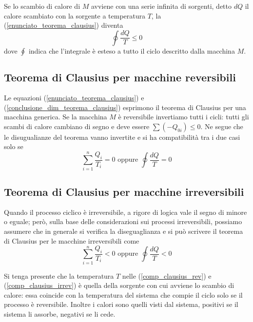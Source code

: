 \documentclass[class=book, crop=false, oneside, 12pt]{standalone}
\begin{document}
Se lo scambio di calore di \(M\) avviene con una serie infinita di sorgenti, detto \(d Q\) il calore scambiato con la sorgente a temperatura \(T\), la (\ref{enunciato_teorema_clausius}) diventa
\begin{equation} \label{conclusione_dim_teorema_clausius}
    \oint \frac{d Q}{T} \leq 0
\end{equation}
dove \(\oint\) indica che l'integrale è esteso a tutto il ciclo descritto dalla macchina \(M\).

\subsection{Teorema di Clausius per macchine reversibili}

Le equazioni (\ref{enunciato_teorema_clausius}) e (\ref{conclusione_dim_teorema_clausius}) esprimono il teorema di Clausius per una macchina generica.
Se la macchina \(M\) è reversibile invertiamo tutti i cicli: tutti gli scambi di calore cambiano di segno e deve essere \(\sum \left(-Q_{0i}\right) \leq 0\). 
Ne segue che le disugualianze del teorema vanno invertite e si ha compatibilità tra i due casi solo se 
\begin{equation} \label{comp_clausius_rev}
    \sum_{i = 1}^{n} \frac{Q_i}{T_i} = 0 \text{ oppure } \oint \frac{d Q}{T} = 0
\end{equation}

\subsection{Teorema di Clausius per macchine irreversibili}

Quando il processo ciclico è irreversibile, a rigore di logica vale il segno di minore o eguale; 
però, sulla base delle considerazioni sui processi irreversibili, possiamo assumere che in generale si verifica la diseguaglianza e si può scrivere il teorema di Clausius per le macchine irreversibili come
\begin{equation} \label{comp_clausius_irrev}
    \sum_{i = 1}^{n} \frac{Q_i}{T_i} < 0 \text{ oppure } \oint \frac{d Q}{T} < 0
\end{equation} 

Si tenga presente che la temperatura \(T\) nelle (\ref{comp_clausius_rev}) e (\ref{comp_clausius_irrev}) è quella della sorgente con cui avviene lo scambio di calore: essa coincide con la temperatura del sistema che compie il ciclo solo se il processo è reversibile. 
Inoltre i calori sono quelli visti dal sistema, positivi se il sistema li assorbe, negativi se li cede.
\end{document}
